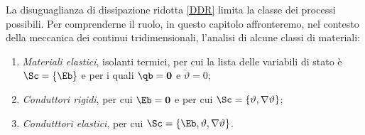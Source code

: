 %


La disuguaglianza di dissipazione ridotta \eqref{DDR} limita la classe dei processi possibili. Per comprenderne il ruolo, in questo capitolo affronteremo, nel contesto della meccanica dei continui tridimensionali, l'analisi di alcune classi di materiali:
\begin{enumerate}
	\item \textit{Materiali elastici}, isolanti termici, per cui la lista delle variabili di stato è $\Sc=\{\Eb\}$ e per i quali $\qb =\mathbf{0}$ e $\dot{\vartheta}=0$;
	\item\textit{ Conduttori rigidi}, per cui $\Eb=\mathbf{0}$ e per cui $\Sc=\{  \vartheta, \nabla\vartheta\}$;
	\item \textit{Condutttori elastici},  per cui $\Sc=\{ \Eb, \vartheta, \nabla\vartheta\}$.
\end{enumerate}


